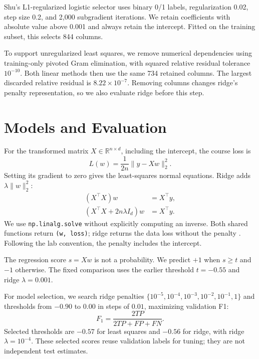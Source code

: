 \documentclass[10pt,conference,compsocconf]{IEEEtran}
\begin{document}
Shu's L1-regularized logistic selector uses binary 0/1 labels,
regularization 0.02, step size 0.2, and 2,000 subgradient
iterations. We retain coefficients with absolute value
above 0.001 and always retain the intercept. Fitted on the
training subset, this selects 844 columns.

To support unregularized least squares, we remove numerical
dependencies using training-only pivoted Gram elimination,
with squared relative residual tolerance $10^{-10}$.
Both linear methods then use the same 734 retained columns.
The largest discarded relative residual is
$8.22\times10^{-7}$. Removing columns changes ridge's penalty
representation, so we also evaluate ridge before this step.

\section{Models and Evaluation}
For the transformed matrix $X\in\mathbb{R}^{n\times d}$,
including the intercept, the course loss is
\begin{equation}
L(w)=\frac{1}{2n}\lVert y-Xw\rVert_2^2.
\end{equation}
Setting its gradient to zero gives the least-squares
normal equations. Ridge adds $\lambda\lVert w\rVert_2^2$:
\begin{align}
(X^\top X)w &= X^\top y,\\
(X^\top X+2n\lambda I_d)w &= X^\top y.
\end{align}
We use \texttt{np.linalg.solve} without explicitly computing
an inverse. Both shared functions return \texttt{(w, loss)};
ridge returns the data loss without the penalty
\cite{course}. Following the lab convention, the penalty
includes the intercept.

The regression score $s=Xw$ is not a probability.
We predict $+1$ when $s\geq t$ and $-1$ otherwise.
The fixed comparison uses the earlier threshold $t=-0.55$
and ridge $\lambda=0.001$.

For model selection, we search ridge penalties
$\{10^{-5},10^{-4},10^{-3},10^{-2},10^{-1},1\}$ and thresholds
from $-0.90$ to $0.00$ in steps of $0.01$, maximizing
validation F1:
\begin{equation}
F_1=\frac{2TP}{2TP+FP+FN}.
\end{equation}
Selected thresholds are $-0.57$ for least squares and
$-0.56$ for ridge, with ridge $\lambda=10^{-4}$.
These selected scores reuse validation labels for tuning;
they are not independent test estimates.
\end{document}

